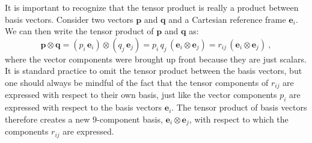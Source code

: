 It is important to recognize that the tensor product is really a product between basis vectors.  Consider two vectors $\mathbf{p}$ and $\mathbf{q}$ and a Cartesian reference frame $\mathbf{e}_i$.  We can then write the tensor product of $\mathbf{p}$ and $\mathbf{q}$ as:
\[
	\mathbf{p}\otimes \mathbf{q} = (p_i\,\mathbf{e}_i)\otimes (q_j\,\mathbf{e}_j) = p_i\,q_j\,(\mathbf{e}_i\otimes\mathbf{e}_j) = r_{ij}\,(\mathbf{e}_i\otimes\mathbf{e}_j)\ ,
\]
where the vector components were brought up front because they are just scalars.  It is standard practice to omit the tensor product between the basis vectors, but one should always be mindful of the fact that the tensor components of $r_{ij}$ are expressed with respect to their own basis, just like the vector components $p_i$ are expressed with respect to the basis vectors $\mathbf{e}_i$.  The tensor product of basis vectors therefore creates a new $9$-component basis, $\mathbf{e}_i\otimes\mathbf{e}_j$, with respect to which the components $r_{ij}$ are expressed. 




